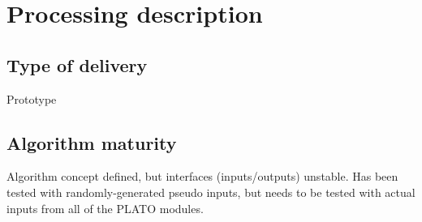 \documentclass[a4paper, oneside, 11pt, article, english]{memoir}
\begin{document}
\chapter{Processing description}
\label{chap:processing}

\section{Type of delivery}
\label{sec:delivery}

Prototype

\iffalse
{
  \itshape

  The algorithms which are specified for the pipeline can come in different
  shapes and forms. We expect that the specifications will be delivered to the
  PDC under different forms, accordingly. Please indicate which one applies to
  the specified algorithm:

  \begin{itemize}
    \firmlist
  \item a legacy code. In that case, please contact WP12 office because some
    quality requirements are needed.
  \item a prototype. In that case, and in the first version of this document, no
    pseudo-code is to be provided.
  \item a pseudo-code. If no prototype exists, a workflow describing the
    algorithm main steps and a detailed pseudo-code is needed for
    implementation.
  \end{itemize}
}
\fi


\section{Algorithm maturity}
\label{sec:mature}

Algorithm concept defined, but interfaces (inputs/outputs) unstable. 
Has been tested with randomly-generated pseudo inputs, but needs to be tested with actual inputs from all of the PLATO modules. 

\iffalse
{
  \itshape

  Please specify the maturity level of the algorithm and do not hesitate to
  provide any further information on the current status of the algorithm. The
  convention for algorithm maturity is defined as:

  \begin{itemize}
    \firmlist
  \item algorithm not defined
  \item algorithm concept defined, but interfaces (inputs/outputs) unstable
  \item algorithm concept defined and interfaces (inputs/outputs) stable, but
    not all processing steps stable
  \item no change or only minor changes expected
  \end{itemize}

}
\fi
\end{document}
